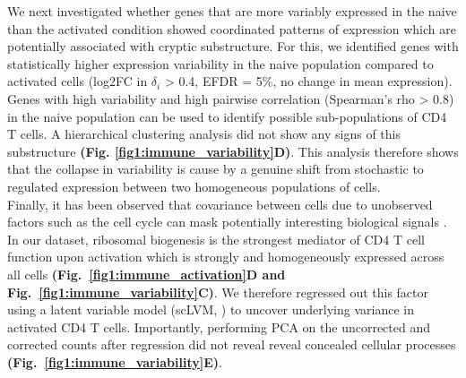 We next investigated whether genes that are more variably expressed in the naive than the activated condition showed coordinated patterns of expression which are potentially associated with cryptic substructure. For this, we identified genes with statistically higher expression variability in the naive population compared to activated cells (log2FC in $\delta_i$ > 0.4, EFDR = 5\%, no change in mean expression). Genes with high variability and high pairwise correlation (Spearman’s rho > 0.8) in the naive population can be used to identify possible sub-populations of CD4\plus{} T cells. A hierarchical clustering analysis did not show any signs of this substructure \textbf{(Fig. \ref{fig1:immune_variability}D)}. This analysis therefore shows that the collapse in variability is cause by a genuine shift from stochastic to regulated expression between two homogeneous populations of cells.\\

Finally, it has been observed that covariance between cells due to unobserved factors such as the cell cycle can mask potentially interesting biological signals \citep{Stegle2015, Buettner2015}. In our dataset, ribosomal biogenesis is the strongest mediator of CD4\plus{} T cell function upon activation which is strongly and homogeneously expressed across all cells \textbf{(Fig.~\ref{fig1:immune_activation}D and Fig.~\ref{fig1:immune_variability}C)}. We therefore regressed out this factor using a latent variable model (scLVM, \citep{Buettner2015}) to uncover underlying variance in activated CD4\plus{} T cells. Importantly, performing PCA on the uncorrected and corrected counts after regression did not reveal reveal concealed cellular processes \textbf{(Fig.~\ref{fig1:immune_variability}E)}.\\

\newpage


